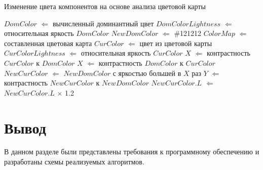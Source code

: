 \begin{algorithm}[H]
	\caption{Изменение цвета компонентов на основе анализа цветовой карты}
	\label{alg:analchange}
	\begin{algorithmic}[1]
		\State $DomColor$ $\Leftarrow$ вычисленный доминантный цвет
		\State $DomColorLightness$ $\Leftarrow$ относительная яркость $DomColor$
		\State $NewDomColor$ $\Leftarrow$ \#121212
		\State $ColorMap$ $\Leftarrow$ составленная цветовая карта
		\State $CurColor$ $\Leftarrow$ цвет из цветовой карты
		\State $CurColorLightness$ $\Leftarrow$ относительная яркость $CurColor$
		\State $X$ $\Leftarrow$ контрастность $CurColor$ к $DomColor$
		\Else
		\State $X$ $\Leftarrow$ контрастность $DomColor$ к $CurColor$
		\EndIf
		\State $NewCurColor$ $\Leftarrow$ $NewDomColor$ с яркостью большей в $X$ раз
		\State $Y$ $\Leftarrow$ контрастность $NewCurColor$ к $NewDomColor$
		\State $NewCurColor.L$ $\Leftarrow$ $NewCurColor.L$ $\times$ 1.2
		\EndWhile
		\EndFor
	\end{algorithmic}
\end{algorithm}


\section*{Вывод}

В данном разделе были представлены требования к программному обеспечению и разработаны схемы реализуемых алгоритмов.